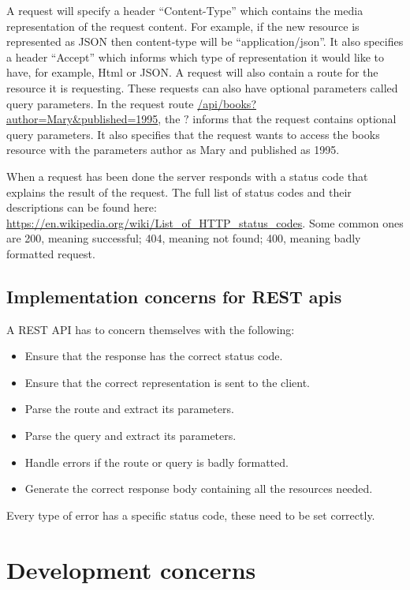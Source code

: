 A request will specify a header ``Content-Type'' which contains the media
representation of the request content. For example, if the new resource is
represented as JSON then content-type will be ``application/json''. It also
specifies a header ``Accept'' which informs which type of representation it
would like to have, for example, Html or JSON.  A request will also contain a
route for the resource it is requesting. These requests can also have optional
parameters called query parameters. In the request route
\url{/api/books?author=Mary&published=1995}, the $?$ informs that the request
contains optional query parameters.  It also specifies that the
request wants to access the books resource with the parameters author as Mary
and published as 1995.

When a request has been done the server responds with a status code that
explains the result of the request. The full list of status codes and their
descriptions can be found here:
\url{https://en.wikipedia.org/wiki/List_of_HTTP_status_codes}. Some common ones
are 200, meaning successful; 404, meaning not found; 400, meaning badly
formatted request.

\subsection{Implementation concerns for REST apis}

A REST API has to concern themselves with the following:

\begin{itemize}
\item Ensure that the response has the correct status code.
\item Ensure that the correct representation is sent to the client.
\item Parse the route and extract its parameters. 
\item Parse the query and extract its parameters.
\item Handle errors if the route or query is badly formatted.
\item Generate the correct response body containing all the resources needed.
\end{itemize}

Every type of error has a specific status code, these need to be set correctly.

\section{Development concerns} 

